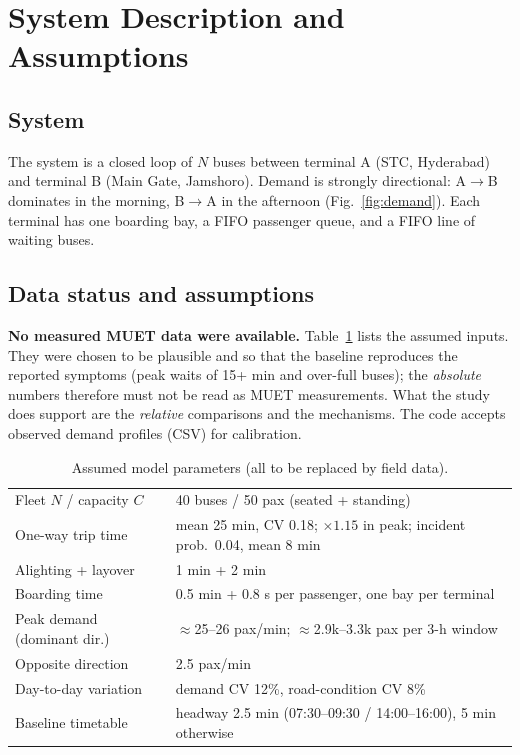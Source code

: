 \documentclass[10pt,twocolumn,letterpaper]{article}
\begin{document}
\section{System Description and Assumptions}
\subsection{System}
The system is a closed loop of $N$ buses between terminal A (STC, Hyderabad) and terminal B (Main Gate, Jamshoro).
Demand is strongly directional: A$\to$B dominates in the morning, B$\to$A in the afternoon
(Fig.~\ref{fig:demand}). Each terminal has one boarding bay, a FIFO passenger queue, and a FIFO line of waiting buses.

\subsection{Data status and assumptions}
\textbf{No measured MUET data were available.} Table~\ref{tab:params} lists the assumed inputs. They were chosen to be
plausible and so that the baseline reproduces the reported symptoms (peak waits of 15+ min and over-full buses); the
\emph{absolute} numbers therefore must not be read as MUET measurements. What the study does support are the \emph{relative} comparisons and the
mechanisms. The code accepts observed demand profiles (CSV) for calibration.

\begin{table}[t]
\centering\caption{Assumed model parameters (all to be replaced by field data).}\label{tab:params}
\footnotesize
\begin{tabular}{@{}lp{}@{}}\toprule
Fleet $N$ / capacity $C$ & 40 buses / 50 pax (seated + standing)\\
One-way trip time & mean 25 min, CV 0.18; $\times1.15$ in peak; incident prob.\ 0.04, mean 8 min\\
Alighting + layover & 1 min + 2 min\\
Boarding time & 0.5 min + 0.8 s per passenger, one bay per terminal\\
Peak demand (dominant dir.) & $\approx$25--26 pax/min; $\approx$2.9k--3.3k pax per 3-h window\\
Opposite direction & 2.5 pax/min\\
Day-to-day variation & demand CV 12\%, road-condition CV 8\%\\
Baseline timetable & headway 2.5 min (07:30--09:30 / 14:00--16:00), 5 min otherwise\\
\bottomrule\end{tabular}
\end{table}
\end{document}
